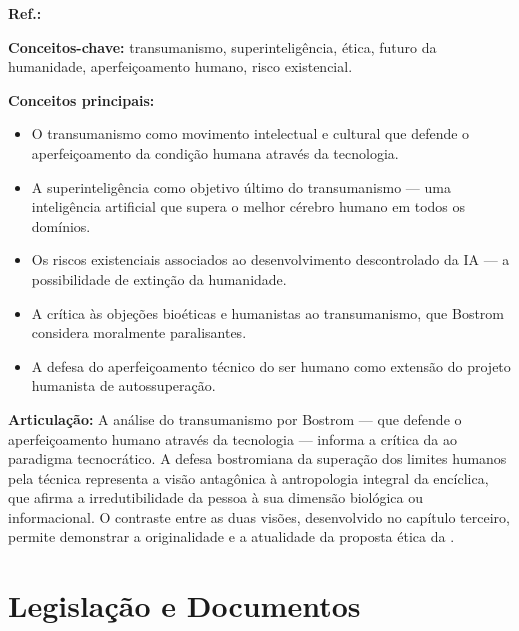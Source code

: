 \begin{fichamento}
    \textbf{Ref.:} \cite{Bostrom2005TH}
    
    \textbf{Conceitos-chave:} transumanismo, superinteligência, ética, futuro da humanidade, aperfeiçoamento humano, risco existencial.
    
    \textbf{Conceitos principais:}
    \begin{itemize}
        \item O transumanismo como movimento intelectual e cultural que defende o aperfeiçoamento da condição humana através da tecnologia.
        \item A superinteligência como objetivo último do transumanismo — uma inteligência artificial que supera o melhor cérebro humano em todos os domínios.
        \item Os riscos existenciais associados ao desenvolvimento descontrolado da IA — a possibilidade de extinção da humanidade.
        \item A crítica às objeções bioéticas e humanistas ao transumanismo, que Bostrom considera moralmente paralisantes.
        \item A defesa do aperfeiçoamento técnico do ser humano como extensão do projeto humanista de autossuperação.
    \end{itemize}
    
    \textbf{Articulação:} A análise do transumanismo por Bostrom — que defende o aperfeiçoamento humano através da tecnologia — informa a crítica da \MH{} ao paradigma tecnocrático. A defesa bostromiana da superação dos limites humanos pela técnica representa a visão antagônica à antropologia integral da encíclica, que afirma a irredutibilidade da pessoa à sua dimensão biológica ou informacional. O contraste entre as duas visões, desenvolvido no capítulo terceiro, permite demonstrar a originalidade e a atualidade da proposta ética da \MH{}.
\end{fichamento}

\section{Legislação e Documentos}


